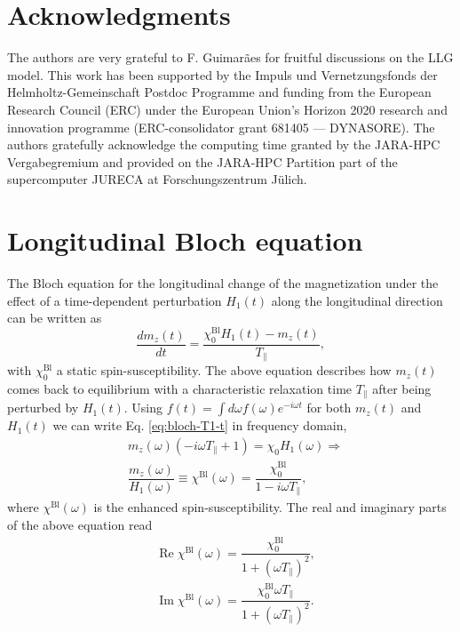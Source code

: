 \documentclass[prb,footinbib,showpacs,twocolumn,amsmath,amssymb]{revtex4}
\renewcommand\Im{\operatorname{Im}}
\renewcommand\Re{\operatorname{Re}}
\begin{document}
\section{Acknowledgments}
The authors are very grateful to F. Guimar\~{a}es
for fruitful discussions on the LLG model.
This work has been supported by the Impuls und
Vernetzungsfonds der Helmholtz-Gemeinschaft Postdoc Programme 
and funding from the European Research Council (ERC) under 
the European Union's Horizon 2020 research and innovation 
programme (ERC-consolidator grant 681405 — DYNASORE).
The authors gratefully acknowledge the computing 
time granted by the JARA-HPC Vergabegremium and provided 
on the JARA-HPC Partition part of the supercomputer JURECA at Forschungszentrum J\"ulich.


\appendix




\section{Longitudinal Bloch equation}
\label{appendix:Bloch-long}



The Bloch equation for the longitudinal change 
of the magnetization under the effect
of a time-dependent perturbation $H_{1}(t)$ along the longitudinal direction 
can be written as~\cite{white_quantum_2007}
\begin{equation}
\label{eq:bloch-T1-t}
\dfrac{dm_{z}(t)}{dt}=\dfrac{\chi^{\text{Bl}}_{0}H_{1}(t)-m_{z}(t)}{T_{\parallel}},
\end{equation}
with $\chi^{\text{Bl}}_{0}$ a static spin-susceptibility.
The above equation describes how $m_{z}(t)$ comes back to equilibrium 
with a characteristic relaxation time $T_{\parallel}$
after being perturbed by $H_{1}(t)$. 
Using $f(t)=\int d\omega f(\omega)e^{-i\omega t}$
for both $m_{z}(t)$ and $H_{1}(t)$ we can write Eq. \ref{eq:bloch-T1-t} in frequency domain,
\begin{equation}
\begin{split}
\label{eq:bloch-T1-w}
&m_{z}(\omega)(-i\omega T_{\parallel} + 1)=\chi_{0}H_{1}(\omega) \Rightarrow \\
&
\dfrac{m_{z}(\omega)}{H_{1}(\omega)}\equiv \chi^{\text{Bl}}(\omega) =
\dfrac{\chi^{\text{Bl}}_{0}}{1-i\omega T_{\parallel}},
\end{split}
\end{equation}
where  $\chi^{\text{Bl}}(\omega)$ is the enhanced spin-susceptibility. 
The real and imaginary parts of the above equation read
\begin{eqnarray}
\label{eqs:bloch-re}
& \Re \chi^{\text{Bl}}(\omega) =  \dfrac{\chi^{\text{Bl}}_{0}}{1+(\omega T_{\parallel})^{2}}, \\
\label{eqs:bloch-im}
& \Im \chi^{\text{Bl}}(\omega) =  \dfrac{\chi^{\text{Bl}}_{0}\omega T_{\parallel}}{1+(\omega T_{\parallel})^{2}}. 
\end{eqnarray}
\end{document}
